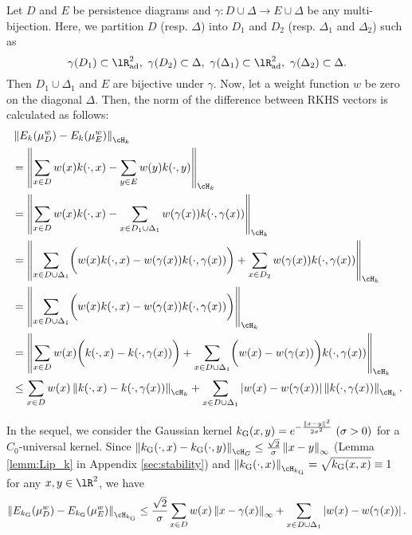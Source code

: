 \documentclass{article}
\newcommand{\DD}{{\Delta}}
\newcommand{\ra}{{\rightarrow}}
\providecommand{\abs}[1]{\left\lvert#1\right\rvert}
\providecommand{\norm}[1]{\left\lVert#1\right\rVert}
\providecommand{\dk}[4]{\norm{E_{#1}(\mu^{#2}_{#3}) - E_{#1}(\mu^{#2}_{#4})}_{\cH_{#1}}}
\begin{document}
Let $D$ and $E$ be persistence diagrams and $\gamma:D \cup \DD \ra E \cup \DD$ be any multi-bijection. Here, we partition $D$ (resp. $\DD$) into $D_{1}$ and $D_{2}$ (resp. $\DD_{1}$ and $\DD_{2}$) such as 
\[
\gamma(D_{1}) \subset \lR^{2}_{{\rm ad}}, \ \gamma(D_{2}) \subset \DD, \ \gamma(\DD_{1}) \subset \lR^{2}_{{\rm ad}}, \ \gamma(\DD_{2}) \subset \DD.
\]
Then $D_{1} \cup \DD_{1}$ and $E$ are bijective under $\gamma$.
Now, let a weight function $w$ be zero on the diagonal $\DD$.
Then, the norm of the difference between RKHS vectors is calculated as follows:
\begin{align*}
&\dk{k}{w}{D}{E} \nonumber \\
&=\norm{ \sum_{x \in D} w(x)k(\cdot,x) -\sum_{y \in E} w(y) k(\cdot,y)}_{\cH_{k}} \nonumber \\
&=\norm{ \sum_{x \in D} w(x)k(\cdot,x) -\sum_{x \in D_{1} \cup \DD_{1}} w(\gamma(x)) k(\cdot,\gamma(x))}_{\cH_{k}} \nonumber \\
&=\norm{ \sum_{x \in D \cup \DD_{1}} \biggl(w(x)k(\cdot,x)-w(\gamma(x))k(\cdot,\gamma(x)) \biggr)   + \sum_{x \in D_{2}} w(\gamma(x))k(\cdot,\gamma(x))}_{\cH_{k}} \nonumber \\
& = \norm{ \sum_{x \in D \cup \DD_{1} } \biggl(w(x)k(\cdot,x)-w(\gamma(x))k(\cdot,\gamma(x))  \biggr)  }_{\cH_{k}} \nonumber \\
& = \norm{ \sum_{x \in D  } w(x) \biggl(k(\cdot,x)-k(\cdot,\gamma(x))  \biggr)  +  \sum_{x \in D \cup \DD_{1} } \biggl(w(x)-w(\gamma(x)) \biggr) k(\cdot,\gamma(x))    }_{\cH_{k}} \nonumber \\
&\leq \sum_{x \in D} w(x) \norm{k(\cdot,x)-k(\cdot,\gamma(x))}_{\cH_{k}}+ \sum_{x \in D \cup \DD_{1}} \abs{w(x)-w(\gamma(x))} \norm{k(\cdot,\gamma(x))}_{\cH_{k}}.
\end{align*}

In the sequel, we consider the Gaussian kernel $k_{{\rm G}}(x,y)=e^{-\frac{\norm{x-y}^{2}}{2 \sigma^{2}}} \ (\sigma>0)$ for a $C_{0}$-universal kernel.
Since $\norm{k_{{\rm G}}(\cdot,x)-k_{{\rm G}}(\cdot,y)}_{\cH_{G}} \leq \frac{\sqrt{2}}{\sigma} \norm{x-y}_{\infty}$ (Lemma \ref{lemm:Lip_k} in Appendix \ref{sec:stability}) and $\norm{k_{{\rm G}}(\cdot,x)}_{\cH_{k_{{\rm G}}}}=\sqrt{k_{{\rm G}}(x,x)} \equiv 1$ for any $x,y \in \lR^{2}$, we have 
\begin{align}
\dk{k_{{\rm G}}}{w}{D}{E} \leq  \frac{\sqrt{2}}{\sigma}\sum_{x \in D} w(x) \norm{x-\gamma(x)}_{\infty}+ \sum_{x \in D \cup \DD_{1}} \abs{w(x)-w(\gamma(x))}.  \label{eq:dk_halfway}
\end{align}
\end{document}
